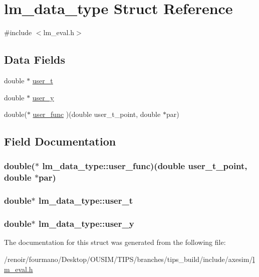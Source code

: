 \hypertarget{structlm__data__type}{
\section{lm\_\-data\_\-type Struct Reference}
\label{structlm__data__type}
}


{\ttfamily \#include $<$lm\_\-eval.h$>$}\subsection*{Data Fields}
\begin{DoxyCompactItemize}
\item 
double $\ast$ \hyperlink{structlm__data__type_acd3cd4e09d35b887f43990f3edeeb618}{user\_\-t}
\item 
double $\ast$ \hyperlink{structlm__data__type_add05e40fc0155605fcfbb0bbf7945582}{user\_\-y}
\item 
double($\ast$ \hyperlink{structlm__data__type_a5f8fb336d9cb4cb59e6cb0cc858ea57d}{user\_\-func} )(double user\_\-t\_\-point, double $\ast$par)
\end{DoxyCompactItemize}


\subsection{Field Documentation}
\hypertarget{structlm__data__type_a5f8fb336d9cb4cb59e6cb0cc858ea57d}{
\subsubsection[{user\_\-func}]{\setlength{\rightskip}{0pt plus 5cm}double($\ast$ {\bf lm\_\-data\_\-type::user\_\-func})(double user\_\-t\_\-point, double $\ast$par)}}
\label{structlm__data__type_a5f8fb336d9cb4cb59e6cb0cc858ea57d}
\hypertarget{structlm__data__type_acd3cd4e09d35b887f43990f3edeeb618}{
\subsubsection[{user\_\-t}]{\setlength{\rightskip}{0pt plus 5cm}double$\ast$ {\bf lm\_\-data\_\-type::user\_\-t}}}
\label{structlm__data__type_acd3cd4e09d35b887f43990f3edeeb618}
\hypertarget{structlm__data__type_add05e40fc0155605fcfbb0bbf7945582}{
\subsubsection[{user\_\-y}]{\setlength{\rightskip}{0pt plus 5cm}double$\ast$ {\bf lm\_\-data\_\-type::user\_\-y}}}
\label{structlm__data__type_add05e40fc0155605fcfbb0bbf7945582}


The documentation for this struct was generated from the following file:\begin{DoxyCompactItemize}
\item 
/renoir/fourmano/Desktop/OUSIM/TIPS/branches/tips\_\-build/include/axesim/\hyperlink{lm__eval_8h}{lm\_\-eval.h}\end{DoxyCompactItemize}
